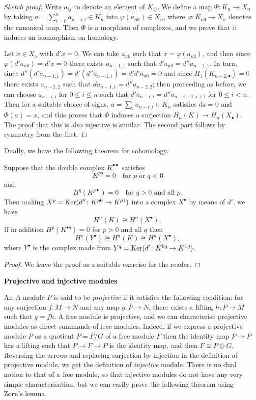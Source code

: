 \begin{proof}[Sketch proof]
Write $a_{ij}$ to denote an element of $K_{ij}$. We define a map
$\Phi\colon K_n \to X_n$ by taking $a = \sum_{i=0}^{n} a_{n-i,i} \in K_n$ into $\varphi(a_{n0}) \in X_n$, where
$\varphi\colon K_{n0} \to X_n$ denotes the canonical map. Then $\Phi$ is a morphism of
complexes, and we prove that it induces an isomorphism on homology.

Let $x \in X_n$ with $d'x = 0$. We can take $a_{n0}$ such that $x = \varphi(a_{n0})$, and
then since $\varphi(d'a_{n0}) = d'x = 0$ there exists $a_{n-1,1}$ such that
$d'a_{n0} = d''a_{n-1,1}$. In turn, since
$d''(d'a_{n-1,1}) = d'(d''a_{n-1,1}) = d'd'a_{n0} = 0$ and since $H_1(K_{n-2,\bullet}) = 0$ there
exists $a_{n-2,2}$ such that $da_{n-1,1} = d''a_{n-2,2}$; then proceeding as before, we can
choose $a_{n-i,i}$ for $0 \le i \le n$ such that $d'a_{n-i,i} = d''a_{n-i-1,i+1}$ for
$0 \le i < n$. Then for a suitable choice of signs,
$a = \sum_i a_{n-i,i} \in K_n$ satisfies $da = 0$ and $\Phi(a) = x$, and this proves that
$\Phi$ induces a surjection $H_n(K) \to H_n(X_\bullet)$. The proof that this is also
injective is similar. The second part follows by symmetry from the first.
\end{proof}

Dually, we have the following theorem for cohomology.

\begin{theorem}\label{thm:B2}
Suppose that the double complex $K^{\bullet\bullet}$ satisfies
\[
  K^{pq} = 0 \quad \text{for } p \text{ or } q < 0
\]
and
\[
  H^q(K^{p\bullet}) = 0 \quad \text{for } q > 0 \text{ and all } p.
\]
Then making $X^p = \operatorname{Ker}(d''\colon K^{p0} \to K^{p1})$ into a complex $X^\bullet$ by means of
$d'$, we have
\[
  H^n(K) \cong H^n(X^\bullet),
\]
If in addition $H^p(K^{\bullet q}) = 0$ for $p > 0$ and all $q$ then
\[
  H^n(Y^\bullet) \cong H^n(K) \cong H^n(X^\bullet),
\]
where $Y^\bullet$ is the complex made from $Y^q = \operatorname{Ker}(d'\colon K^{0q} \to K^{1q})$.
\end{theorem}

\begin{proof}
We leave the proof as a suitable exercise for the reader.
\end{proof}

\medskip
\noindent\textbf{Projective and injective modules}

An $A$-module $P$ is said to be \emph{projective} if it satisfies the following condition:
for any surjection $f\colon M \to N$ and any map $g\colon P \to N$, there exists a lifting
$h\colon P \to M$ such that $g = fh$. A free module is projective, and we can
characterise projective modules as direct summands of free modules. Indeed, if
we express a projective module $P$ as a quotient $P = F/G$ of a free module $F$
then the identity map $P \to P$ has a lifting such that $P \to F \to P$ is the identity
map, and then $F \cong P \oplus G$. Reversing the arrows and replacing surjection by
injection in the definition of projective module, we get the definition of
\emph{injective} module. There is no dual notion to that of a free module, so that
injective modules do not have any very simple characterisation, but we can
easily prove the following theorem using Zorn's lemma.

